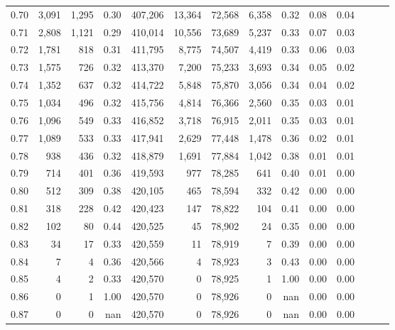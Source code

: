 \begin{tabular}{rrrrrrrrrrrrrr}
0.70 &   3,091 &  1,295 &  0.30 &  407,206 &   13,364 &  72,568 &   6,358 &  0.32 &  0.08 &      0.04 \\
0.71 &   2,808 &  1,121 &  0.29 &  410,014 &   10,556 &  73,689 &   5,237 &  0.33 &  0.07 &      0.03 \\
0.72 &   1,781 &    818 &  0.31 &  411,795 &    8,775 &  74,507 &   4,419 &  0.33 &  0.06 &      0.03 \\
0.73 &   1,575 &    726 &  0.32 &  413,370 &    7,200 &  75,233 &   3,693 &  0.34 &  0.05 &      0.02 \\
0.74 &   1,352 &    637 &  0.32 &  414,722 &    5,848 &  75,870 &   3,056 &  0.34 &  0.04 &      0.02 \\
0.75 &   1,034 &    496 &  0.32 &  415,756 &    4,814 &  76,366 &   2,560 &  0.35 &  0.03 &      0.01 \\
0.76 &   1,096 &    549 &  0.33 &  416,852 &    3,718 &  76,915 &   2,011 &  0.35 &  0.03 &      0.01 \\
0.77 &   1,089 &    533 &  0.33 &  417,941 &    2,629 &  77,448 &   1,478 &  0.36 &  0.02 &      0.01 \\
0.78 &     938 &    436 &  0.32 &  418,879 &    1,691 &  77,884 &   1,042 &  0.38 &  0.01 &      0.01 \\
0.79 &     714 &    401 &  0.36 &  419,593 &      977 &  78,285 &     641 &  0.40 &  0.01 &      0.00 \\
0.80 &     512 &    309 &  0.38 &  420,105 &      465 &  78,594 &     332 &  0.42 &  0.00 &      0.00 \\
0.81 &     318 &    228 &  0.42 &  420,423 &      147 &  78,822 &     104 &  0.41 &  0.00 &      0.00 \\
0.82 &     102 &     80 &  0.44 &  420,525 &       45 &  78,902 &      24 &  0.35 &  0.00 &      0.00 \\
0.83 &      34 &     17 &  0.33 &  420,559 &       11 &  78,919 &       7 &  0.39 &  0.00 &      0.00 \\
0.84 &       7 &      4 &  0.36 &  420,566 &        4 &  78,923 &       3 &  0.43 &  0.00 &      0.00 \\
0.85 &       4 &      2 &  0.33 &  420,570 &        0 &  78,925 &       1 &  1.00 &  0.00 &      0.00 \\
0.86 &       0 &      1 &  1.00 &  420,570 &        0 &  78,926 &       0 &   nan &  0.00 &      0.00 \\
0.87 &       0 &      0 &   nan &  420,570 &        0 &  78,926 &       0 &   nan &  0.00 &      0.00 \\

\end{tabular}
